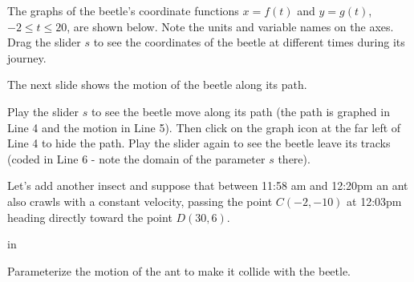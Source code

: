 \documentclass{ximera}
\newcommand{\pskip}{\vskip 0.1 in}
\begin{document}
\begin{exploration}\label{exp:pc1}
The graphs of the beetle's coordinate functions $x=f(t)$ and $y=g(t)$, $-2\leq t \leq 20$, are shown below. Note the units and variable names on the axes. Drag the slider $s$ to see the coordinates of the beetle at different times during its journey.
 
 
\begin{onlineOnly}
    \begin{center}
\end{center}
\end{onlineOnly}
\end{exploration}

The next slide shows the motion of the beetle along its path.

\begin{exploration}\label{exp:pc1b}
Play the slider $s$ to see the beetle move along its path (the path is graphed in Line 4 and the motion in Line 5). Then click on the graph icon at the far left of Line 4 to hide the path. Play the slider again to see the beetle leave its tracks (coded in Line 6 - note the domain of the parameter $s$ there).
 
 
\begin{onlineOnly}
    \begin{center}
\end{center}
\end{onlineOnly}
\end{exploration}


Let's add another insect and suppose that between 11:58 am and 12:20pm an ant also crawls with a constant velocity, passing the point $C(-2,-10)$ at 12:03pm heading directly toward the point $D(30,6)$.

\pskip

\begin{example} \label{Ex2}

 Parameterize the motion of the ant to make it collide with the beetle.

\end{example}
\end{document}
